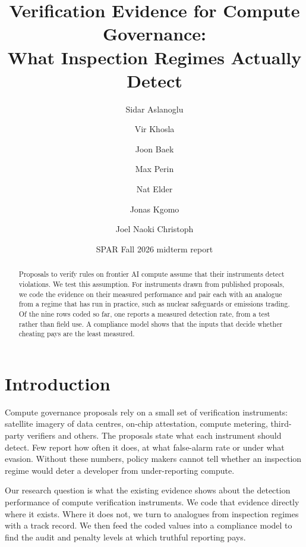 \documentclass[11pt,a4paper]{article}
\title{Verification Evidence for Compute Governance:\\What Inspection Regimes Actually Detect}
\author{Sidar Aslanoglu \and Vir Khosla \and Joon Baek \and Max Perin \and Nat Elder \and Jonas Kgomo \and Joel Naoki Christoph}
\date{SPAR Fall 2026 midterm report}
\newif\ifhighlight
\newcommand{\addtext}[1]{\ifhighlight{\color{newtext}#1}\else#1\fi}
\begin{document}
\maketitle

\ifhighlight
\begin{center}
\fbox{\parbox{0.9\linewidth}{\small\color{newtext}\textbf{Review copy.} Blue text was added on 28 October: simulation results from the sixth run, three figures, two tables and an appendix on the simulation. Everything in black is the 26 October draft. To print it all in black, change \texttt{\textbackslash highlighttrue} to \texttt{\textbackslash highlightfalse} at the top of the file.}}
\end{center}
\fi

\begin{abstract}
Proposals to verify rules on frontier AI compute assume that their instruments detect violations. We test this assumption. For instruments drawn from published proposals, we code the evidence on their measured performance and pair each with an analogue from a regime that has run in practice, such as nuclear safeguards or emissions trading. Of the nine rows coded so far, one reports a measured detection rate, from a test rather than field use. \addtext{A compliance model shows that the inputs that decide whether cheating pays are the least measured.}
\end{abstract}

\section{Introduction}
Compute governance proposals rely on a small set of verification instruments: satellite imagery of data centres, on-chip attestation, compute metering, third-party verifiers and others. The proposals state what each instrument should detect. Few report how often it does, at what false-alarm rate or under what evasion. Without these numbers, policy makers cannot tell whether an inspection regime would deter a developer from under-reporting compute.

Our research question is what the existing evidence shows about the detection performance of compute verification instruments. We code that evidence directly where it exists. Where it does not, we turn to analogues from inspection regimes with a track record. We then feed the coded values into a compliance model to find the audit and penalty levels at which truthful reporting pays.
\end{document}
